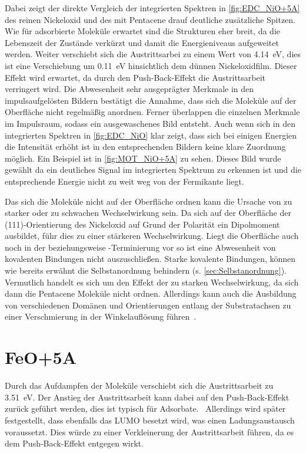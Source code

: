         Dabei zeigt der direkte Vergleich der integrierten Spektren in \autoref{fig:EDC_NiO+5A} des reinen Nickeloxid und des mit Pentacene drauf deutliche zusätzliche Spitzen.
        Wie für adsorbierte Moleküle erwartet sind die Strukturen eher breit, da die Lebenszeit der Zustände verkürzt und damit die Energieniveaus aufgeweitet werden.
        Weiter verschiebt sich die Austrittsarbei zu einem Wert von \SI{4.14}{\electronvolt}, dies ist eine Verschiebung um \SI{0.11}{\electronvolt} hinsichtlich dem dünnen Nickeloxidfilm.
        Dieser Effekt wird erwartet, da durch den Push-Back-Effekt die Austrittsarbeit verringert wird.
        Die Abwesenheit sehr ausgeprägter Merkmale in den impulsaufgelösten Bildern bestätigt die Annahme, dass sich die Moleküle auf der Oberfläche nicht regelmäßig anordnen.
        Ferner überlappen die einzelnen Merkmale im Impulsraum, sodass ein ausgewaschenes Bild entsteht.
        Auch wenn sich in den integrierten Spektren in \autoref{fig:EDC_NiO} klar zeigt, dass sich bei einigen Energien die Intensität erhöht ist in den entsprechenden Bildern keine klare Zuordnung möglich.
        Ein Beispiel ist in \autoref{fig:MOT_NiO+5A} zu sehen.
        Dieses Bild wurde gewählt da ein deutliches Signal im integrierten Spektrum zu erkennen ist und die entsprechende Energie nicht zu weit weg von der Fermikante liegt.

        Das sich die Moleküle nicht auf der Oberfläche ordnen kann die Ursache von zu starker oder zu schwachen Wechselwirkung sein.
        Da sich auf der Oberfläche der (111)-Orientierung des Nickeloxid auf Grund der Polarität ein Dipolmoment ausbildet, führ dies zu einer stärkeren Wechselwirkung.
        Liegt die Oberfläche auch noch in der  beziehungsweise -Terminierung vor so ist eine Abwesenheit von kovalenten Bindungen nicht auszuschließen.
        Starke kovalente Bindungen, können wie bereits erwähnt die Selbstanordnung behindern (s. \autoref{sec:Selbstanordnung}).
        Vermutlich handelt es sich um den Effekt der zu starken Wechselwirkung, da sich dann die Pentacene Moleküle nicht ordnen.
        Allerdings kann auch die Ausbildung von verschiedenen Domänen und Orientierungen entlang der Substratachsen zu einer Verschmierung in der Winkelauflösung führen~\cite{Schöll und Schreiber - 2018 - Chapter 24 - Thin Films of Organic Molecules Inte.pdf}.


        \section{FeO+5A}
        Durch das Aufdampfen der Moleküle verschiebt sich die Austrittsarbeit zu \SI{3.51}{\electronvolt}.
        Der Anstieg der Austrittsarbeit kann dabei auf den Push-Back-Effekt zurück geführt werden, dies ist typisch für Adsorbate.~\cite{Goiri}
        Allerdings wird später festgestellt, dass ebenfalls das LUMO besetzt wird, was einen Ladungsaustausch voraussetzt.
        Dies würde zu einer Verkleinerung der Austrittsarbeit führen, da es dem Push-Back-Effekt entgegen wirkt.


